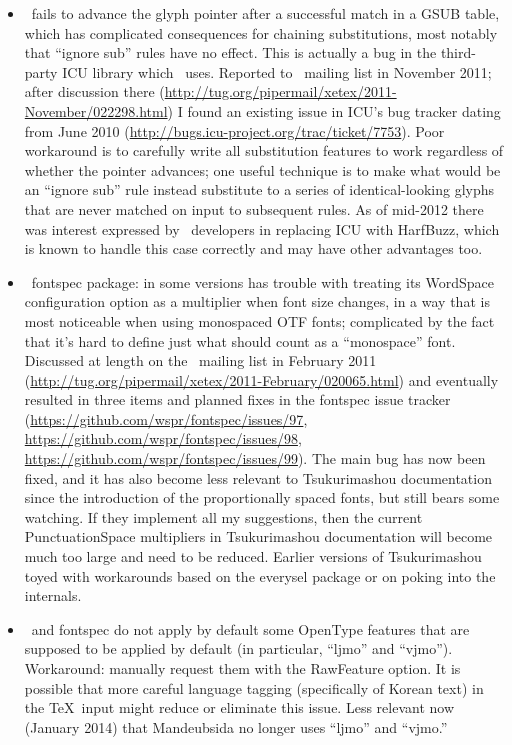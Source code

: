 \documentclass[14pt]{extarticle}
\begin{document}
\begin{itemize}
  \item \XeTeX\ fails to advance the glyph pointer after a successful
    match in a GSUB table, which has complicated consequences for chaining
    substitutions, most notably that ``ignore sub'' rules have no effect.
    This is actually a bug in the third-party ICU library which \XeTeX\ uses.
    Reported to \XeTeX\ mailing list in November 2011; after discussion there
    (\url{http://tug.org/pipermail/xetex/2011-November/022298.html}) I found
    an existing issue in ICU's bug tracker dating from June 2010
    (\url{http://bugs.icu-project.org/trac/ticket/7753}).  Poor
    workaround is to carefully write all substitution features to work
    regardless of whether the pointer advances; one useful technique is to
    make what would be an ``ignore sub'' rule instead substitute to a
    series of identical-looking glyphs that are never matched on input to
    subsequent rules.  As of mid-2012 there was interest expressed by
    \XeTeX\ developers in replacing ICU with HarfBuzz, which is known to
    handle this case correctly and may have other advantages too.

  \item \XeTeX\ fontspec package: in some versions has trouble with treating
    its WordSpace configuration option as a multiplier when font size
    changes, in a way that is most noticeable when using monospaced OTF
    fonts; complicated by the fact that it's hard to define just what should
    count as a ``monospace'' font.  Discussed at length on the \XeTeX\ 
    mailing list in February 2011
    (\url{http://tug.org/pipermail/xetex/2011-February/020065.html}) and
    eventually resulted in three items and planned fixes in the fontspec issue
    tracker (\url{https://github.com/wspr/fontspec/issues/97},
    \url{https://github.com/wspr/fontspec/issues/98},
    \url{https://github.com/wspr/fontspec/issues/99}).  The main bug has now
    been fixed, and it has also become less relevant to Tsukurimashou
    documentation since the introduction of the proportionally spaced fonts,
    but still bears some watching.  If they implement all my suggestions,
    then the current PunctuationSpace multipliers in Tsukurimashou
    documentation will become much too large and need to be reduced.
    Earlier versions of Tsukurimashou toyed with workarounds based on the
    everysel package or on poking into the internals.

  \item \XeTeX\ and fontspec do not apply by default some OpenType features
    that are supposed to be applied by default (in particular, ``ljmo'' and
    ``vjmo'').  Workaround: manually request them with the RawFeature
    option.  It is possible that more careful language tagging (specifically
    of Korean text) in the \TeX\ input might reduce or eliminate this issue.
    Less relevant now (January 2014) that Mandeubsida no longer uses
    ``ljmo'' and ``vjmo.''


\end{itemize}
\end{document}
